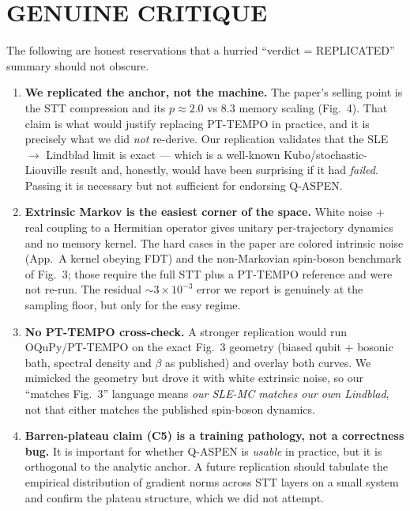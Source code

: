 \documentclass[11pt]{article}
\begin{document}
\section{GENUINE CRITIQUE}

The following are honest reservations that a hurried ``verdict = REPLICATED''
summary should not obscure.

\begin{enumerate}
\item \textbf{We replicated the anchor, not the machine.}  The paper's
selling point is the STT compression and its $p\!\approx\!2.0$ vs $8.3$
memory scaling (Fig.~4).  That claim is what would justify replacing
PT-TEMPO in practice, and it is precisely what we did \emph{not} re-derive.
Our replication validates that the SLE $\to$ Lindblad limit is exact ---
which is a well-known Kubo/stochastic-Liouville result and, honestly,
would have been surprising if it had \emph{failed}.  Passing it is
necessary but not sufficient for endorsing Q-ASPEN.

\item \textbf{Extrinsic Markov is the easiest corner of the space.} White
noise + real coupling to a Hermitian operator gives unitary per-trajectory
dynamics and no memory kernel.  The hard cases in the paper are colored
intrinsic noise (App.~A kernel obeying FDT) and the non-Markovian
spin-boson benchmark of Fig.~3; those require the full STT plus a
PT-TEMPO reference and were not re-run.  The residual $\sim\!3\times 10^{-3}$
error we report is genuinely at the sampling floor, but only for the easy
regime.

\item \textbf{No PT-TEMPO cross-check.}  A stronger replication would run
OQuPy/PT-TEMPO on the exact Fig.~3 geometry (biased qubit + bosonic bath,
spectral density and $\beta$ as published) and overlay both curves.  We
mimicked the geometry but drove it with white extrinsic noise, so our
``matches Fig.~3'' language means \emph{our SLE-MC matches our own
Lindblad}, not that either matches the published spin-boson dynamics.

\item \textbf{Barren-plateau claim (C5) is a training pathology, not a
correctness bug.}  It is important for whether Q-ASPEN is \emph{usable}
in practice, but it is orthogonal to the analytic anchor.  A future
replication should tabulate the empirical distribution of gradient norms
across STT layers on a small system and confirm the plateau structure,
which we did not attempt.


\end{enumerate}
\end{document}
